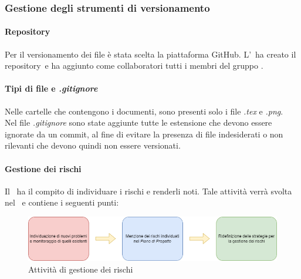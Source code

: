     \subsubsection{Gestione degli strumenti di versionamento}
      \paragraph{Repository\glo}
        Per il versionamento dei file è stata scelta la piattaforma GitHub\glo. L'\roleAdministratorLow\ ha creato il repository\glo\ e ha aggiunto 
        come collaboratori tutti i membri del gruppo \groupName.

      \paragraph{Tipi di file e \textit{.gitignore}}
        Nelle cartelle che contengono i documenti, sono presenti solo i file \textit{.tex} e \textit{.png}.\\
        Nel file \textit{.gitignore} sono state aggiunte tutte le estensione che devono essere ignorate da un commit, al fine di evitare la presenza di file indesiderati 
        o non rilevanti che devono quindi non essere versionati.
    \paragraph {Gestione dei rischi}
      Il \roleProjectManagerLow\ ha il compito di individuare i rischi e renderli noti. Tale attività verrà svolta nel \docNamePdPLow\ e contiene i seguenti punti:
      \begin{figure}[htbp]
        \centering 
         \includegraphics[scale =0.7]{../template/images/NdP/GestioneRischi.png}
         \caption{Attività di gestione dei rischi}
      \end {figure}
      
